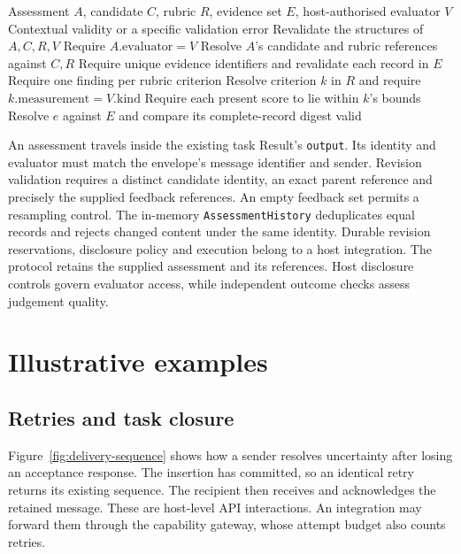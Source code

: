 \documentclass[preprint,12pt,a4paper]{elsarticle}
\newcommand{\code}[1]{\texttt{#1}}
\begin{document}
\begin{algorithm}[htbp]
\caption{Validate an assessment against retained context}\label{alg:validate-assessment}
\begin{algorithmic}[1]
\Require Assessment $A$, candidate $C$, rubric $R$, evidence set $E$,
\Statex \hspace{\algorithmicindent}host-authorised evaluator $V$
\Ensure Contextual validity or a specific validation error
\State Revalidate the structures of $A,C,R,V$
\State Require $A.\mathrm{evaluator}=V$
\State Resolve $A$'s candidate and rubric references against $C,R$
\State Require unique evidence identifiers and revalidate each record in $E$
  \State Require one finding per rubric criterion
\EndIf
{}
  \State Resolve criterion $k$ in $R$ and require $k.\mathrm{measurement}=V.\mathrm{kind}$
  \State Require each present score to lie within $k$'s bounds
    \State Resolve $e$ against $E$ and compare its complete-record digest
  \EndFor
\EndFor
\State \Return valid
\end{algorithmic}
\end{algorithm}

An assessment travels inside the existing task Result's \code{output}. Its identity and evaluator must match the envelope's message identifier and sender. Revision validation requires a distinct candidate identity, an exact parent reference and precisely the supplied feedback references. An empty feedback set permits a resampling control. The in-memory \code{AssessmentHistory} deduplicates equal records and rejects changed content under the same identity. Durable revision reservations, disclosure policy and execution belong to a host integration. The protocol retains the supplied assessment and its references. Host disclosure controls govern evaluator access, while independent outcome checks assess judgement quality.

\section{Illustrative examples}
\subsection{Retries and task closure}
Figure~\ref{fig:delivery-sequence} shows how a sender resolves uncertainty after losing an acceptance response. The insertion has committed, so an identical retry returns its existing sequence. The recipient then receives and acknowledges the retained message. These are host-level API interactions. An integration may forward them through the capability gateway, whose attempt budget also counts retries.
\end{document}
